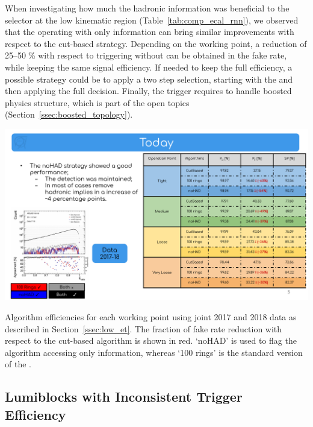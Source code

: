 When investigating how much the hadronic information was beneficial to the
selector at the low kinematic region (Table~\ref{tab:comp_ecal_rnn}), we
observed that the \rnn{} operating with only \ecal{} information can bring
similar improvements with respect to the cut-based strategy. Depending on the
working point, a reduction of 25--50$\;$\% with respect to triggering without
\rnn{} can be obtained in the \fastcalo{} fake rate, while keeping the same
signal efficiency. If needed to keep the full \rnn{} efficiency, a possible
strategy could be to apply a two step \fastcalo selection, starting with the
\ecal{} and then applying the full \rnn{} decision. Finally, the \BeeK{} trigger
requires \rnn{} to handle boosted physics structure, which is part of the open
topics (Section~\ref{ssec:boosted_topology}).

\begin{table}[htb]
  \centering
  \includegraphics[width=.65\textwidth]{appendices/figures/low_et/nodhad_comparison_with_cutbased}
  \caption{Algorithm efficiencies for each working point using joint 2017 and
    2018 data as described in Section~\ref{ssec:low_et}. The fraction of fake
    rate reduction with respect to the cut-based algorithm is shown in red.
    `noHAD' is used to flag the \rnn{} algorithm accessing only \ecal{}
    information, whereas `100 rings' is the standard version of the \rnn{}.
  \label{tab:comp_ecal_rnn}}
\end{table}


\subsection{Lumiblocks with Inconsistent Trigger Efficiency}\label{ssec:lbs_lower_eff}

